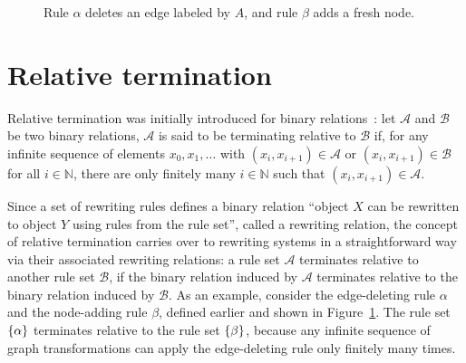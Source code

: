 \begin{figure}[H]
{{
            }
        }
    \caption{Rule $\alpha$ deletes an edge labeled by $A$, and rule $\beta$ adds a fresh node.}
    \label{fig:intro:edge_deletion_and_node_addition_rule}
  \end{figure}


\section{Relative termination} 
Relative termination was initially introduced for binary relations~\cite{klop1987term}: let $\mathcal{A}$ and $\mathcal{B}$ be two binary relations, $\mathcal{A}$ is said to be terminating relative to $\mathcal{B}$ if, for any infinite sequence of elements \( x_0, x_1, \ldots \) with \( (x_i,x_{i+1}) \in \mathcal{A} \) or \( (x_i,x_{i+1}) \in \mathcal{B} \) for all \( i \in \mathbb{N} \), there are only finitely many \( i \in \mathbb{N} \) such that \( (x_i,x_{i+1}) \in \mathcal{A} \).

Since a set of rewriting rules defines a binary relation \enquote{object $X$ can be rewritten to object $Y$ using rules from the rule set}, called a rewriting relation,
the concept of relative termination
carries over to rewriting systems in a straightforward way via their associated rewriting relations: a rule set $\mathcal{A}$ terminates relative to another rule set $\mathcal{B}$, if the binary relation induced by $\mathcal{A}$ terminates relative to the binary relation induced by $\mathcal{B}$.
As an example, consider the edge-deleting rule $\alpha$ and the node-adding rule $\beta$, defined earlier and shown in Figure~\ref{fig:intro:edge_deletion_and_node_addition_rule}. 
The rule set $\{\alpha\}$ terminates relative to the rule set $\{\beta\}$, because any infinite sequence of graph transformations can apply the edge-deleting rule only finitely many times.

